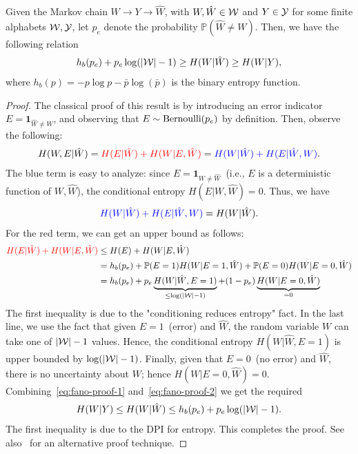 \documentclass[12pt]{article}
\begin{document}
\begin{theorem}
\label{theorem:fano} 
Given the Markov chain $W \rightarrow Y \rightarrow \hat{W}$, with $W, \hat{W} \in {\cal W}$ and $Y \in {\cal Y}$ for some finite alphabets ${\cal W}, {\cal Y}$, let $p_e$ denote the probability $\mathbb{P}(\hat{W} \neq W)$. Then, we have the following relation 
\begin{align}
h_b(p_e) + p_e \log(|{\cal W}|-1) \geq H(W|\hat{W}) \geq H(W|Y), 
\end{align}
where $h_b(p) = - p \log p - \bar{p}\log(\bar{p})$ is the binary entropy function. 
\end{theorem}
\begin{proof}
The classical proof of this result is by introducing an error indicator $E = \boldsymbol{1}_{\hat{W}\neq W}$, and observing that $E \sim \mathrm{Bernoulli}(p_e)$ by definition. Then, observe the following: 
\begin{align}
H(W, E|\hat{W}) = \textcolor{red}{H(E|\hat{W}) + H(W|E, \hat{W})} = \textcolor{blue}{H(W|\hat{W}) + H(E|\hat{W}, W)}. 
\end{align}
The blue term is easy to analyze: since $E = \boldsymbol{1}_{W \neq \hat{W}}$~(i.e., $E$ is a deterministic function of $W, \hat{W}$), the conditional entropy $H(E|W, \hat{W}) = 0$. Thus, we have 
\begin{align}
\textcolor{blue}{H(W|\hat{W}) + H(E|\hat{W}, W)} =  H(W|\hat{W}). \label{eq:fano-proof-1}
\end{align}
For the red term, we can get an upper bound as follows: 
\begin{align}
	\textcolor{red}{H(E|\hat{W}) + H(W|E, \hat{W})} &\leq H(E) +  H(W|E, \hat{W}) \\
	& = h_b(p_e) + \mathbb{P}(E=1) H(W|E=1, \hat{W}) +  \mathbb{P}(E=0) H(W|E=0, \hat{W}) \\
	& = h_b(p_e) + p_e \underbrace{H(W|\hat{W}, E=1)}_{\leq \log(|{\cal W}|-1)} + (1-p_e) \underbrace{H(W|E=0, \hat{W})}_{=0} \label{eq:fano-proof-2}
\end{align}
The first inequality is due to the "conditioning reduces entropy" fact. In the last line, we use the fact that given $E=1$~(error) and $\hat{W}$, the random variable $W$ can take one of $|{\cal W}|-1$ values. Hence, the conditional entropy $H(W|\hat{W}, E=1)$ is upper bounded by $\log(|{\cal W}|-1)$. Finally, given that $E=0$~(no error) and $\hat{W}$, there is no uncertainty about $W$; hence $H(W|E=0, \hat{W})=0$. Combining~\eqref{eq:fano-proof-1} and~\eqref{eq:fano-proof-2} we get the required 
\begin{align}
H(W|Y) \leq H(W|\hat{W}) \leq  h_b(p_e) + p_e\log(|{\cal W}|-1). 
\end{align}
The first inequality is due to the DPI for entropy.  This completes the proof. See also~\citep[Section~3.6]{polyanskiy2025information} for an alternative proof technique. 
\end{proof}
\end{document}
